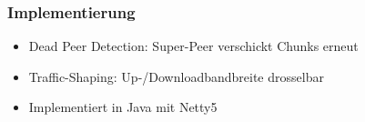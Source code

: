\begin{frame}
  \frametitle{Implementierung}
  \begin{itemize}  
    \item Dead Peer Detection: Super-Peer verschickt Chunks erneut
    \vspace{1mm}
    \item Traffic-Shaping: Up-/Downloadbandbreite drosselbar
    \vspace{1mm}
    \item Implementiert in Java mit Netty5
  \end{itemize} 
\end{frame}



